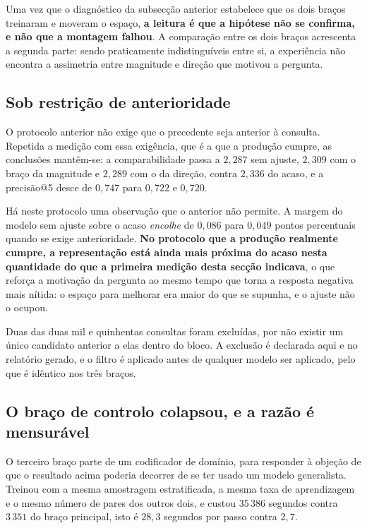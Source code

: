 Uma vez que o diagnóstico da subsecção anterior estabelece que os dois braços treinaram e
moveram o espaço, \textbf{a leitura é que a hipótese não se confirma, e não que a montagem
falhou}. A comparação entre os dois braços acrescenta a segunda parte: sendo praticamente
indistinguíveis entre si, a experiência não encontra a assimetria entre magnitude e direção que
motivou a pergunta.

\subsection{Sob restrição de anterioridade}

O protocolo anterior não exige que o precedente seja anterior à consulta. Repetida a medição com
essa exigência, que é a que a produção cumpre, as conclusões mantêm-se: a comparabilidade passa a
$2{,}287$ sem ajuste, $2{,}309$ com o braço da magnitude e $2{,}289$ com o da direção, contra
$2{,}336$ do acaso, e a precisão@5 desce de $0{,}747$ para $0{,}722$ e $0{,}720$.

Há neste protocolo uma observação que o anterior não permite. A margem do modelo sem ajuste sobre
o acaso \emph{encolhe} de $0{,}086$ para $0{,}049$ pontos percentuais quando se exige
anterioridade. \textbf{No protocolo que a produção realmente cumpre, a representação está ainda
mais próxima do acaso nesta quantidade do que a primeira medição desta secção indicava}, o que
reforça a motivação da pergunta ao mesmo tempo que torna a resposta negativa mais nítida: o
espaço para melhorar era maior do que se supunha, e o ajuste não o ocupou.

Duas das duas mil e quinhentas consultas foram excluídas, por não existir um único candidato
anterior a elas dentro do bloco. A exclusão é declarada aqui e no relatório gerado, e o filtro é
aplicado antes de qualquer modelo ser aplicado, pelo que é idêntico nos três braços.

\subsection{O braço de controlo colapsou, e a razão é mensurável}

O terceiro braço parte de um codificador de domínio, para responder à objeção de que o resultado
acima poderia decorrer de se ter usado um modelo generalista. Treinou com a mesma amostragem
estratificada, a mesma taxa de aprendizagem e o mesmo número de pares dos outros dois, e custou
$35\,386$ segundos contra $3\,351$ do braço principal, isto é $28{,}3$ segundos por passo contra
$2{,}7$.

